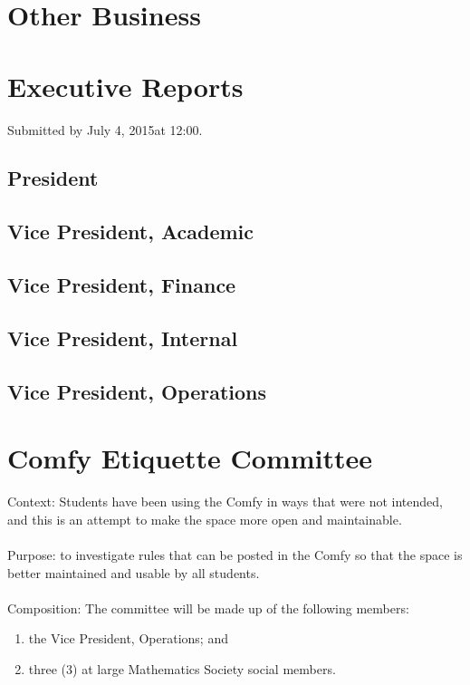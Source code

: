 \documentclass[12pt, letterpaper]{article}
\newcommand{\agendaDate}{July 4, 2015} %
\begin{document}
\section*{Other Business}
\begin{description}
	\item 
\end{description}
\HRule

\newpage
%

\newpage
\section*{Executive Reports}
Submitted by \agendaDate at 12:00.

\subsection*{President}


\subsection*{Vice President, Academic}


\subsection*{Vice President, Finance}


\subsection*{Vice President, Internal}


\subsection*{Vice President, Operations}


\newpage
{}
\section*{Comfy Etiquette Committee}
Context: Students have been using the Comfy in ways that were not intended, and this is an attempt to make the space more open and maintainable.  \\\\
Purpose: to investigate rules that can be posted in the Comfy so that the space is better maintained and usable by all students. \\\\
Composition: The committee will be made up of the following members:
\begin{enumerate}
	\item the Vice President, Operations; and
	\item three (3) at large Mathematics Society social members.
\end{enumerate}
\end{document}

